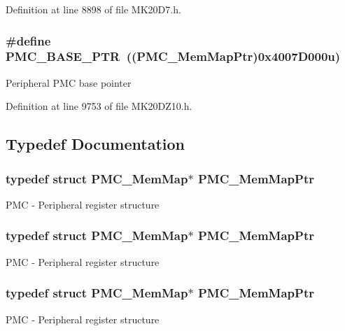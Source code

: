 Definition at line 8898 of file M\+K20\+D7.\+h.

\subsubsection[{\texorpdfstring{P\+M\+C\+\_\+\+B\+A\+S\+E\+\_\+\+P\+TR}{PMC_BASE_PTR}}]{\setlength{\rightskip}{0pt plus 5cm}\#define P\+M\+C\+\_\+\+B\+A\+S\+E\+\_\+\+P\+TR~(({\bf P\+M\+C\+\_\+\+Mem\+Map\+Ptr})0x4007\+D000u)}\hypertarget{group___p_m_c___peripheral_gaf32df9f1096263f10a5e8978a338b2ac}{}\label{group___p_m_c___peripheral_gaf32df9f1096263f10a5e8978a338b2ac}
Peripheral P\+MC base pointer 

Definition at line 9753 of file M\+K20\+D\+Z10.\+h.



\subsection{Typedef Documentation}
\subsubsection[{\texorpdfstring{P\+M\+C\+\_\+\+Mem\+Map\+Ptr}{PMC_MemMapPtr}}]{\setlength{\rightskip}{0pt plus 5cm}typedef struct {\bf P\+M\+C\+\_\+\+Mem\+Map}$\ast$ {\bf P\+M\+C\+\_\+\+Mem\+Map\+Ptr}}\hypertarget{group___p_m_c___peripheral_ga0e73f22a2fa26cbb012851719e34812e}{}\label{group___p_m_c___peripheral_ga0e73f22a2fa26cbb012851719e34812e}
P\+MC -\/ Peripheral register structure 
\subsubsection[{\texorpdfstring{P\+M\+C\+\_\+\+Mem\+Map\+Ptr}{PMC_MemMapPtr}}]{\setlength{\rightskip}{0pt plus 5cm}typedef struct {\bf P\+M\+C\+\_\+\+Mem\+Map}$\ast$ {\bf P\+M\+C\+\_\+\+Mem\+Map\+Ptr}}\hypertarget{group___p_m_c___peripheral_ga0e73f22a2fa26cbb012851719e34812e}{}\label{group___p_m_c___peripheral_ga0e73f22a2fa26cbb012851719e34812e}
P\+MC -\/ Peripheral register structure 
\subsubsection[{\texorpdfstring{P\+M\+C\+\_\+\+Mem\+Map\+Ptr}{PMC_MemMapPtr}}]{\setlength{\rightskip}{0pt plus 5cm}typedef struct {\bf P\+M\+C\+\_\+\+Mem\+Map}$\ast$ {\bf P\+M\+C\+\_\+\+Mem\+Map\+Ptr}}\hypertarget{group___p_m_c___peripheral_ga0e73f22a2fa26cbb012851719e34812e}{}\label{group___p_m_c___peripheral_ga0e73f22a2fa26cbb012851719e34812e}
P\+MC -\/ Peripheral register structure 